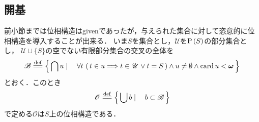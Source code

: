 \subsection{開基}
	前小節までは位相構造はgivenであったが，与えられた集合に対して恣意的に位相構造を導入することが出来る．
	いま$S$を集合とし，$\mathscr{U}$を$\operatorname*{P} \left(S\right)$の部分集合とし，
	$\mathscr{U} \cup \{S\}$の空でない有限部分集合の交叉の全体を
	\begin{align}
		\mathscr{B} \defeq \Set{\bigcap u}{
		\forall t\, \left(\, t \in u \Longrightarrow t \in \mathscr{U} \vee t = S\, \right) \wedge u \neq \emptyset \wedge \card{u} < \Natural}
	\end{align}
	とおく．このとき
	\begin{align}
		\mathscr{O} \defeq \Set{\bigcup b}{b \subset \mathscr{B}}
	\end{align}
	で定める$\mathscr{O}$は$S$上の位相構造である．
	
